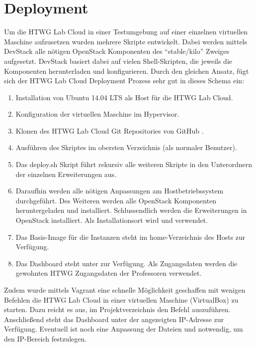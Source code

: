 \chapter{Deployment}

Um die HTWG Lab Cloud in einer Testumgebung auf einer einzelnen virtuellen Maschine aufzusetzen wurden mehrere  Skripte entwickelt.
Dabei werden mittels DevStack \cite{devstack} alle nötigen OpenStack Komponenten des \enquote{stable/kilo} Zweiges aufgesetzt.
DevStack basiert dabei auf vielen Shell-Skripten, die jeweils die Komponenten herunterladen und konfigurieren.
Durch den gleichen Ansatz, fügt sich der HTWG Lab Cloud Deployment Prozess sehr gut in dieses Schema ein:

\begin{enumerate}
\item Installation von Ubuntu 14.04 LTS als Host für die HTWG Lab Cloud.
\item Konfiguration der virtuellen Maschine im Hypervisor.
\item Klonen des HTWG Lab Cloud Git Repositories von GitHub \cite{git-source}.
\item Ausführen des  Skriptes im obersten Verzeichnis (als normaler Benutzer).
\item Das deploy.sh Skript führt rekursiv alle weiteren Skripte in den Unterordnern der einzelnen Erweiterungen aus.
\item Daraufhin werden alle nötigen Anpassungen am Hostbetriebssystem durchgeführt.  Des Weiteren werden alle OpenStack Komponenten heruntergeladen und installiert. Schlussendlich werden die Erweiterungen in OpenStack installiert. Als Installationsort wird  und  verwendet.
\item Das Basis-Image für die Instanzen steht im home-Verzeichnis des Hosts zur Verfügung.
\item Das Dashboard steht unter  zur Verfügung. Als Zugangsdaten werden die gewohnten HTWG Zugangsdaten der Professoren verwendet.
\end{enumerate}

Zudem wurde mittels Vagrant \cite{Vagrant} eine schnelle Möglichkeit geschaffen mit wenigen Befehlen die HTWG Lab Cloud in einer virtuellen Maschine (VirtualBox) zu starten. 
Dazu reicht es aus, im Projektverzeichnis den Befehl  auszuführen.
Anschließend steht das Dashboard unter der angezeigten IP-Adresse zur Verfügung.
Eventuell ist noch eine Anpassung der Dateien  und  notwendig, um den IP-Bereich festzulegen.

